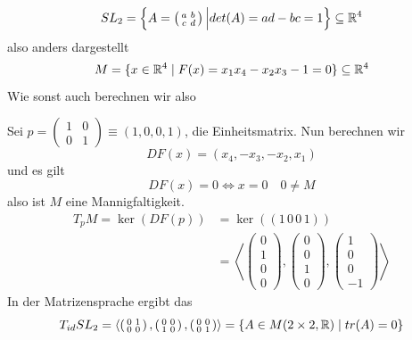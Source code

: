 \documentclass[main.tex]{subfiles}
\begin{document}
\begin{Beispiel}
  $$SL_2 = \left \{ A = \left(\begin{smallmatrix}
    a & b\\c & d
  \end{smallmatrix} \right) \Big | det(A) = ad - bc = 1 \right \} \subseteq \mathbb{R}^4$$
  also anders dargestellt
  $$M = \{x \in \mathbb{R}^4 \mid F(x) = x_1x_4 - x_2x_3 -1 = 0\} \subseteq \mathbb{R}^4$$
  Wie sonst auch berechnen wir also

  Sei $p = \left(\begin{smallmatrix}
    1 & 0 \\ 0 & 1
  \end{smallmatrix}\right) \equiv (1,0,0,1)$, die Einheitsmatrix. Nun berechnen wir
  $$DF(x) = (x_4, -x_3, -x_2,x_1)$$
  und es gilt
  $$DF(x) = 0 \Leftrightarrow x = 0 \quad 0 \neq M$$
  also ist $M$ eine Mannigfaltigkeit.
  $$\begin{aligned}
    T_p M = \ker(DF(p)) & = \ker((1 \, 0 \, 0 \, 1))\\
    & = \left<\left(\begin{smallmatrix}
      0 \\ 1 \\ 0 \\ 0
    \end{smallmatrix}\right),\left(\begin{smallmatrix}
      0 \\ 0 \\ 1 \\ 0
    \end{smallmatrix}\right),\left(\begin{smallmatrix}
      1 \\ 0 \\ 0 \\ -1
    \end{smallmatrix}\right)\right>
  \end{aligned}$$
  In der Matrizensprache ergibt das
  $$T_{id} SL_2 = \left< \left(\begin{smallmatrix}
    0 & 1 \\ 0 & 0
  \end{smallmatrix}\right), \left(\begin{smallmatrix}
    0 & 0 \\ 1 & 0
  \end{smallmatrix}\right), \left(\begin{smallmatrix}
    0 & 0 \\ 0 & 1
  \end{smallmatrix}\right) \right> = \{A \in M(2\times2,\mathbb{R}) \mid tr(A) = 0\}$$
\end{Beispiel}
\end{document}
